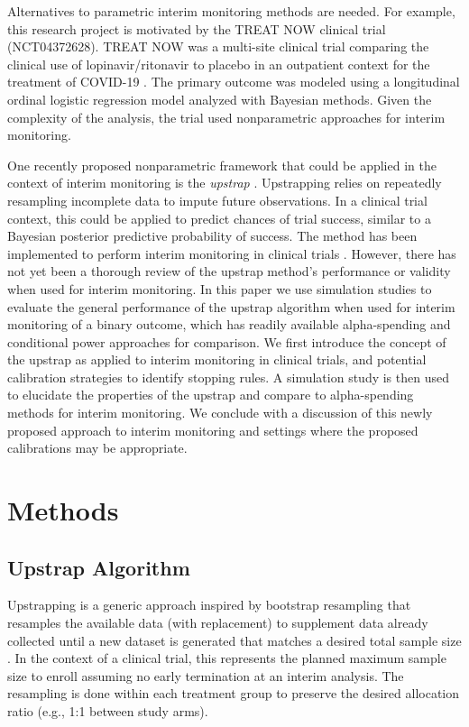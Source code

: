 \documentclass[Afour,sageh,times,square,numbers]{sagej}
\begin{document}
Alternatives to parametric interim monitoring methods are needed.  For example, this research project is motivated by the TREAT NOW clinical trial (NCT04372628). TREAT NOW was a multi-site clinical trial comparing the clinical use of lopinavir/ritonavir to placebo in an outpatient context for the treatment of COVID-19 \cite{R4, R9}.  The primary outcome was modeled using a longitudinal ordinal logistic regression model analyzed with Bayesian methods. Given the complexity of the analysis, the trial used nonparametric approaches for interim monitoring.

One recently proposed nonparametric framework that could be applied in the context of interim monitoring is the \textit{upstrap} \cite{R7}.  Upstrapping relies on repeatedly resampling incomplete data to impute future observations. In a clinical trial context, this could be applied to predict chances of trial success, similar to a Bayesian posterior predictive probability of success.  The method has been implemented to perform interim monitoring in clinical trials \cite{R8}.  However, there has not yet been a thorough review of the upstrap method’s performance or validity when used for interim monitoring.  In this paper we use simulation studies to evaluate the general performance of the upstrap algorithm when used for interim monitoring of a binary outcome, which has readily available alpha-spending and conditional power approaches for comparison. We first introduce the concept of the upstrap as applied to interim monitoring in clinical trials, and potential calibration strategies to identify stopping rules. A simulation study is then used to elucidate the properties of the upstrap and compare to alpha-spending methods for interim monitoring. We conclude with a discussion of this newly proposed approach to interim monitoring and settings where the proposed calibrations may be appropriate.

\section{Methods}

\subsection{Upstrap Algorithm}

Upstrapping is a generic approach inspired by bootstrap resampling that resamples the available data (with replacement) to supplement data already collected until a new dataset is generated that matches a desired total sample size \cite{R7}. In the context of a clinical trial, this represents the planned maximum sample size to enroll assuming no early termination at an interim analysis.  The resampling is done within each treatment group to preserve the desired allocation ratio (e.g., 1:1 between study arms).  
\end{document}
